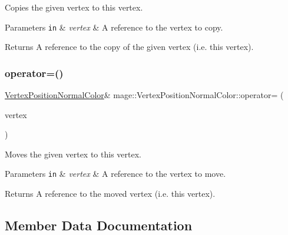 Copies the given vertex to this vertex.


\begin{DoxyParams}[1]{Parameters}
\mbox{\tt in}  & {\em vertex} & A reference to the vertex to copy. \\
\hline
\end{DoxyParams}
\begin{DoxyReturn}{Returns}
A reference to the copy of the given vertex (i.\+e. this vertex). 
\end{DoxyReturn}
\hypertarget{structmage_1_1_vertex_position_normal_color_a81420d3cad27061049fe23bf4aaba64f}{}\label{structmage_1_1_vertex_position_normal_color_a81420d3cad27061049fe23bf4aaba64f} 
\subsubsection{\texorpdfstring{operator=()}{operator=()}\hspace{0.1cm}{\footnotesize\ttfamily [2/2]}}
{\footnotesize\ttfamily \hyperlink{structmage_1_1_vertex_position_normal_color}{Vertex\+Position\+Normal\+Color}\& mage\+::\+Vertex\+Position\+Normal\+Color\+::operator= (\begin{DoxyParamCaption}\item[{\hyperlink{structmage_1_1_vertex_position_normal_color}{Vertex\+Position\+Normal\+Color} \&\&}]{vertex }\end{DoxyParamCaption})\hspace{0.3cm}{\ttfamily [default]}}

Moves the given vertex to this vertex.


\begin{DoxyParams}[1]{Parameters}
\mbox{\tt in}  & {\em vertex} & A reference to the vertex to move. \\
\hline
\end{DoxyParams}
\begin{DoxyReturn}{Returns}
A reference to the moved vertex (i.\+e. this vertex). 
\end{DoxyReturn}


\subsection{Member Data Documentation}
\hypertarget{structmage_1_1_vertex_position_normal_color_a32876d6ab674130330651f9fa3daabd0}{}\label{structmage_1_1_vertex_position_normal_color_a32876d6ab674130330651f9fa3daabd0} 
